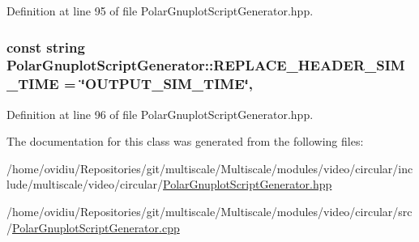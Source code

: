 Definition at line 95 of file Polar\-Gnuplot\-Script\-Generator.\-hpp.

\hypertarget{classmultiscale_1_1video_1_1PolarGnuplotScriptGenerator_ab06a56e8ac6c117d9a3d1279bd114941}{
\subsubsection[{R\-E\-P\-L\-A\-C\-E\-\_\-\-H\-E\-A\-D\-E\-R\-\_\-\-S\-I\-M\-\_\-\-T\-I\-M\-E}]{\setlength{\rightskip}{0pt plus 5cm}const string Polar\-Gnuplot\-Script\-Generator\-::\-R\-E\-P\-L\-A\-C\-E\-\_\-\-H\-E\-A\-D\-E\-R\-\_\-\-S\-I\-M\-\_\-\-T\-I\-M\-E = \char`\"{}O\-U\-T\-P\-U\-T\-\_\-\-S\-I\-M\-\_\-\-T\-I\-M\-E\char`\"{}\hspace{0.3cm}{\ttfamily [static]}, {\ttfamily [private]}}}\label{classmultiscale_1_1video_1_1PolarGnuplotScriptGenerator_ab06a56e8ac6c117d9a3d1279bd114941}


Definition at line 96 of file Polar\-Gnuplot\-Script\-Generator.\-hpp.



The documentation for this class was generated from the following files\-:\begin{DoxyCompactItemize}
\item 
/home/ovidiu/\-Repositories/git/multiscale/\-Multiscale/modules/video/circular/include/multiscale/video/circular/\hyperlink{PolarGnuplotScriptGenerator_8hpp}{Polar\-Gnuplot\-Script\-Generator.\-hpp}\item 
/home/ovidiu/\-Repositories/git/multiscale/\-Multiscale/modules/video/circular/src/\hyperlink{PolarGnuplotScriptGenerator_8cpp}{Polar\-Gnuplot\-Script\-Generator.\-cpp}\end{DoxyCompactItemize}
